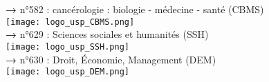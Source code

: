 \documentclass[french,12pt,a4paper]{book}
\begin{document}
\noindent \textbf{\color{Prune}→} n°582 : cancérologie : biologie - médecine - santé (CBMS)\\
\texttt{[image: logo\_usp\_CBMS.png]}\\

\noindent \textbf{\color{Prune}→} n°629 : Sciences sociales et humanités (SSH)\\
\texttt{[image: logo\_usp\_SSH.png]}\\

\noindent \textbf{\color{Prune}→} n°630 : Droit, Économie, Management (DEM)\\
\texttt{[image: logo\_usp\_DEM.png]}\\
\end{document}
